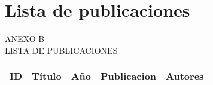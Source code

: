 
{
\Hide
\chapter{Lista de publicaciones}
}

\begin{titular} 
	\uppercase{
	Anexo B \\
	Lista de publicaciones \\
	}
\end{titular}

\begin{landscape}
\small

\renewcommand{\arraystretch}{1}
\begin{longtable}{p{0.5cm} p{5cm}  p{1.5cm} p{4.7cm} p{4.7cm} }

\hline
\multicolumn{1}{|c|}{\textbf{ID}} & \multicolumn{1}{|c|}{\textbf{Título}} & \multicolumn{1}{|c|}{\textbf{Año}}  & \multicolumn{1}{c|}{\textbf{Publicacion}} & \multicolumn{1}{c|}{\textbf{Autores}} \\ 
\hline
\endhead

\hline


\end{longtable}
\end{landscape}
